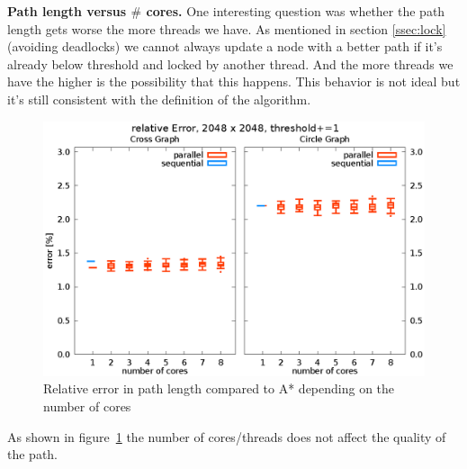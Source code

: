 \documentclass[letterpaper]{article}
\newcommand{\mypar}[1]{{\bf #1.}}
\begin{document}
\mypar{Path length versus $\#$ cores}
One interesting question was whether the path length gets worse the more threads we have. As mentioned in section \ref{ssec:lock} (avoiding deadlocks) we cannot always update a node with a better path if it's already below threshold and locked by another thread. And the more threads we have the higher is the possibility that this happens. This behavior is not ideal but it's still consistent with the definition of the algorithm.
\begin{figure}[h]\centering
  \includegraphics[scale=0.558]{error_cores.eps}
  \caption{Relative error in path length compared to A* depending on the number of cores\label{fig:error_cores}}
\end{figure}
As shown in figure~\ref{fig:error_cores} the number of cores/threads does not affect the quality of the path.
\end{document}
